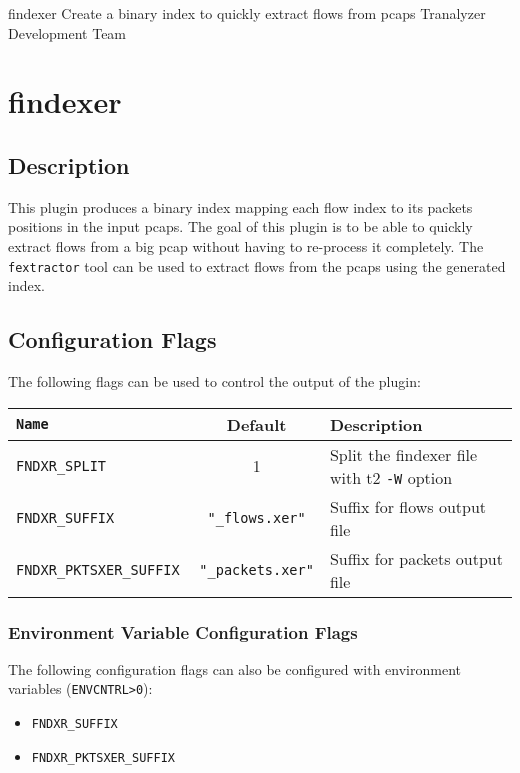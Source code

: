 \documentclass[documentation]{subfiles}
\begin{document}
\trantitle
    {findexer}
    {Create a binary index to quickly extract flows from pcaps}
    {Tranalyzer Development Team} %

\section{findexer}\label{s:findexer}

\setlength{\parindent}{0cm}

\subsection{Description}
This plugin produces a binary index mapping each flow index to its packets positions in the input pcaps.
The goal of this plugin is to be able to quickly extract flows from a big pcap without having to
re-process it completely. The {\tt fextractor} tool can be used to extract flows from the pcaps using
the generated index.

\subsection{Configuration Flags}
The following flags can be used to control the output of the plugin:
\begin{longtable}{>{\tt}lcl}
    \toprule
    {\bf Name}             & {\bf Default}               & {\bf Description}\\
    \midrule\endhead%
    FNDXR\_SPLIT           & 1                           & Split the findexer file with t2 {\tt -W} option\\
    FNDXR\_SUFFIX          & {\tt\small "\_flows.xer"}   & Suffix for flows output file\\
    FNDXR\_PKTSXER\_SUFFIX & {\tt\small "\_packets.xer"} & Suffix for packets output file\\
    \bottomrule
\end{longtable}

\subsubsection{Environment Variable Configuration Flags}
The following configuration flags can also be configured with environment variables ({\tt ENVCNTRL>0}):
\begin{itemize}
    \item {\tt FNDXR\_SUFFIX}
    \item {\tt FNDXR\_PKTSXER\_SUFFIX}
\end{itemize}
\end{document}
